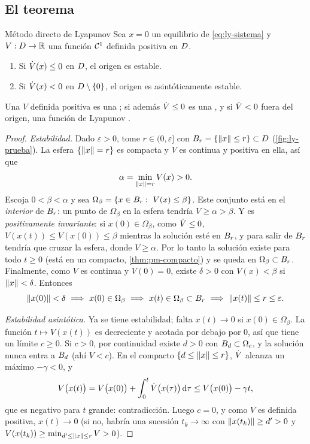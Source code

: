 \subsection{El teorema}

\begin{teorema}[label=thm:ly-directo]{Método directo de Lyapunov \citep[Teo.~4.1]{Kha02}}
Sea $x=0$ un equilibrio de \eqref{eq:ly-sistema} y $V:D\to\mathbb{R}$ una función $\mathcal{C}^{1}$ definida positiva en $D$.
\begin{enumerate}
  \item Si $\dot V(x)\le0$ en $D$, el origen es estable.
  \item Si $\dot V(x)<0$ en $D\setminus\{0\}$, el origen es asintóticamente estable.
\end{enumerate}
\end{teorema}

Una $V$ definida positiva es una ; si además $\dot V\le0$ es una , y si $\dot V<0$ fuera del origen, una función de Lyapunov .

\begin{proof}
\emph{Estabilidad.} Dado $\varepsilon>0$, tome $r\in(0,\varepsilon]$ con $B_{r}=\{\left\lVert x\right\rVert\le r\}\subset D$ (\cref{fig:ly-prueba}). La esfera $\{\left\lVert x\right\rVert=r\}$ es compacta y $V$ es continua y positiva en ella, así que
\[
  \alpha=\min_{\left\lVert x\right\rVert=r}V(x)>0 .
\]
Escoja $0<\beta<\alpha$ y sea $\Omega_\beta=\{x\in\Bola r:\ V(x)\le\beta\}$. Este conjunto está en el \emph{interior} de $B_{r}$: un punto de $\Omega_\beta$ en la esfera tendría $V\ge\alpha>\beta$. Y es \emph{positivamente invariante}: si $x(0)\in\Omega_\beta$, como $\dot V\le0$, $V(x(t))\le V(x(0))\le\beta$ mientras la solución esté en $B_{r}$, y para salir de $B_{r}$ tendría que cruzar la esfera, donde $V\ge\alpha$. Por lo tanto la solución existe para todo $t\ge0$ (está en un compacto, \cref{thm:pm-compacto}) y se queda en $\Omega_\beta\subset B_{r}$. Finalmente, como $V$ es continua y $V(0)=0$, existe $\delta>0$ con $V(x)<\beta$ si $\left\lVert x\right\rVert<\delta$. Entonces
\[
  \norm{x(0)}<\delta\ \Longrightarrow\ x(0)\in\Omega_\beta\ \Longrightarrow\ x(t)\in\Omega_\beta\subset\Bola r\ \Longrightarrow\ \norm{x(t)}\le r\le\varepsilon .
\]

\emph{Estabilidad asintótica.} Ya se tiene estabilidad; falta $x(t)\to0$ si $x(0)\in\Omega_\beta$. La función $t\mapsto V(x(t))$ es decreciente y acotada por debajo por $0$, así que tiene un límite $c\ge0$. Si $c>0$, por continuidad existe $d>0$ con $B_{d}\subset\Omega_c$, y la solución nunca entra a $B_{d}$ (ahí $V<c$). En el compacto $\{d\le\left\lVert x\right\rVert\le r\}$, $\dot V$ alcanza un máximo $-\gamma<0$, y
\[
  V\bigl(x(t)\bigr)=V\bigl(x(0)\bigr)+\int_0^t\dot V\bigl(x(\tau)\bigr)\,\mathrm{d}\tau\le V\bigl(x(0)\bigr)-\gamma t ,
\]
que es negativo para $t$ grande: contradicción. Luego $c=0$, y como $V$ es definida positiva, $x(t)\to0$ (si no, habría una sucesión $t_k\to\infty$ con $\left\lVert x(t_k)\right\rVert\ge d'>0$ y $V(x(t_k))\ge\min_{d'\le\left\lVert x\right\rVert\le r}V>0$).
\end{proof}

